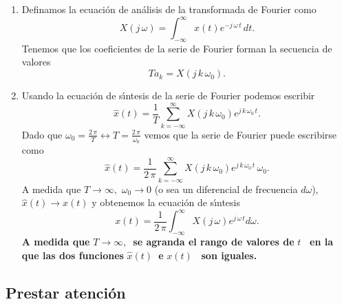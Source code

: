 \begin{enumerate}
        \item  Definamos la ecuaci\'{o}n de an\'{a}lisis de la transformada de Fourier como 
        \begin{equation}
                X\left( j \, \omega \right) =\int_{-\infty }^{\infty }x\left( t\right)e^{-j \, \omega \, t} \, dt.
        \end{equation}
        Tenemos que los coeficientes de la serie de Fourier forman la secuencia de valores 
        \begin{equation}
                Ta_{k}=X\left( j \, k \, \omega_{0}\right) .
        \end{equation}

        \item  Usando la ecuaci\'{o}n de s\'{\i}ntesis de la serie de Fourier podemos escribir 
        \begin{equation}
            \hat{x}\left( t\right) =
               \frac{1}{T}\sum_{k=-\infty }^{\infty }X\left(j \, k \, \omega_{0}\right) e^{j \, k \, \omega_{0} \, t}.
        \end{equation}
        Dado que $\omega _{0}=\frac{2 \, \pi }{T}\longleftrightarrow T=\frac{2 \, \pi }{\omega _{0}}$ 
        vemos que la serie de Fourier puede escribirse como
        \begin{equation}
           \hat{x}\left( t\right) =
           \frac{1}{2 \, \pi }
              \sum_{k=-\infty }^{\infty }X\left(j \, k \, \omega_{0}\right) e^{j \, k \, \omega_{0} \, t} \, \omega _{0}.
        \end{equation}
        A medida que $T\rightarrow \infty ,$ $\omega _{0}\rightarrow 0$ (o sea un diferencial de 
        frecuencia $d\omega $), $\hat{x}\left( t\right) \rightarrow x\left( t\right) $ y obtenemos la 
        ecuaci\'{o}n de s\'{\i}ntesis 
        \begin{equation}
           x\left( t\right) =
              \frac{1}{2 \, \pi }\int_{-\infty }^{\infty }X\left( j \, \omega \right) e^{j \, \omega \, t}d\omega .
        \end{equation}
        \textbf{A medida que }$T\rightarrow \infty ,$\textbf{\ se agranda el rango de valores de } $t$ 
        \textbf{\ en la que las dos funciones }$\hat{x}\left(t\right) $\textbf{\ e }$x\left( t\right) $
        \textbf{\ son iguales.}
\end{enumerate}

\subsection{Prestar atenci\'{o}n}

